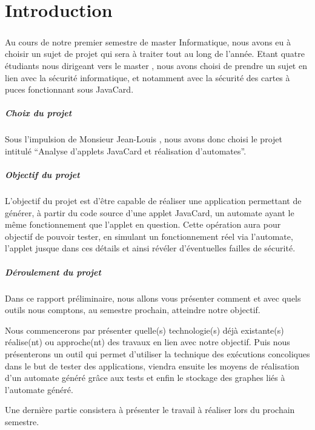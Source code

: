 \setcounter{page}{1}
\chapter*{Introduction}

\paragraph{}
Au cours de notre premier semestre de master Informatique, nous avons eu à choisir un sujet de projet qui sera à traiter tout au long de l'année.
Etant quatre étudiants nous dirigeant vers le master , nous avons choisi de prendre un sujet en lien avec la sécurité informatique, et notamment avec la sécurité des cartes à puces fonctionnant sous JavaCard.

\paragraph{Choix du projet}
Sous l'impulsion de Monsieur Jean-Louis , nous avons donc choisi le projet intitulé ``Analyse d'applets JavaCard et réalisation d'automates''.

\paragraph{Objectif du projet}
L'objectif du projet est d'être capable de réaliser une application permettant de générer, à partir du code source d'une applet JavaCard, un automate ayant le même fonctionnement que l'applet en question. Cette opération aura pour objectif de pouvoir tester, en simulant un fonctionnement réel via l'automate, l'applet jusque dans ces détails et ainsi révéler d'éventuelles failles de sécurité.

\paragraph{Déroulement du projet}
Dans ce rapport préliminaire, nous allons vous présenter comment et avec quels outils nous comptons, au semestre prochain, atteindre notre objectif.

Nous commencerons par présenter quelle(s) technologie(s) déjà existante(s) réalise(nt) ou approche(nt) des travaux en lien avec notre objectif. Puis nous présenterons un outil qui permet d'utiliser la technique des exécutions concoliques dans le but de tester des applications, viendra ensuite les moyens de réalisation d'un automate généré grâce aux tests et enfin le stockage des graphes liés à l'automate généré.

Une dernière partie consistera à présenter le travail à réaliser lors du prochain semestre.